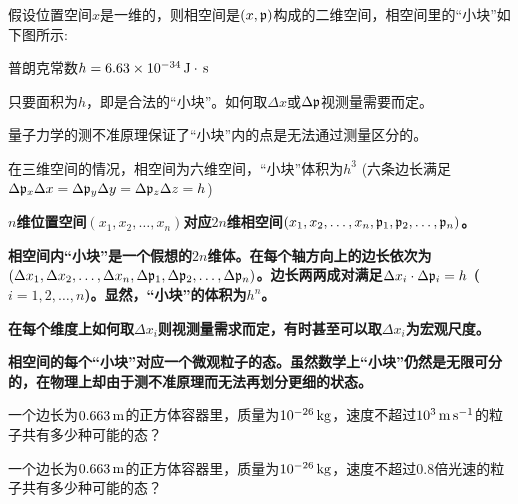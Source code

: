\documentclass[CJK]{beamer}
\begin{document}
\begin{frame}
\bch
假设位置空间$x$是一维的，则相空间是$(x, {\mathfrak{p}})$构成的二维空间，相空间里的“小块”如下图所示:
\emini
{}
\bitem
\item{普朗克常数$h=6.63\times 10^{-34}\,\mathrm{J}\cdot\,\mathrm{s}$}
\item{只要面积为$h$，即是合法的“小块”。如何取$\Delta x$或$\Delta {\mathfrak{p}}$视测量需要而定。}
\item{量子力学的测不准原理保证了“小块”内的点是无法通过测量区分的。}
\eitem
\emini

\skipline

在三维空间的情况，相空间为六维空间，“小块”体积为$h^3$ (六条边长满足$\Delta {\mathfrak{p}}_x\Delta x =\Delta {\mathfrak{p}}_y\Delta y =\Delta {\mathfrak{p}}_z\Delta z = h$)
\ech
\end{frame}


\begin{frame}
\bch
\bitem
\item{\bf $n$维位置空间$(x_1, x_2, \ldots, x_n)$对应$2n$维相空间$(x_1, x_2, \ldots, x_n, {\mathfrak{p}}_1, {\mathfrak{p}}_2, \ldots, {\mathfrak{p}}_n)$。}
\item{\bf 相空间内“小块”是一个假想的$2n$维体。在每个轴方向上的边长依次为$(\Delta x_1, \Delta x_2, \ldots, \Delta x_n, \Delta {\mathfrak{p}}_1, \Delta {\mathfrak{p}}_2, \ldots, \Delta {\mathfrak{p}}_n)$。边长两两成对满足$\Delta x_i \cdot \Delta {\mathfrak{p}}_i = h$ ($i=1, 2, \ldots, n$)。显然，“小块”的体积为$h^n$。}
\item{\bf 在每个维度上如何取$\Delta x_i$则视测量需求而定，有时甚至可以取$\Delta x_i$为宏观尺度。}
\item{\bf 相空间的每个“小块”对应一个微观粒子的态。虽然数学上“小块”仍然是无限可分的，在物理上却由于测不准原理而无法再划分更细的状态。}
\eitem
\ech
\end{frame}

\begin{frame}
\bch
一个边长为$0.663\,\mathrm{m}$的正方体容器里，质量为$10^{-26}\,\mathrm{kg}$，速度不超过$10^3\,\mathrm{m}\,\mathrm{s}^{-1}$的粒子共有多少种可能的态？
\ech
\end{frame}

\begin{frame}
\bch
一个边长为$0.663\,\mathrm{m}$的正方体容器里，质量为$10^{-26}\,\mathrm{kg}$，速度不超过$0.8$倍光速的粒子共有多少种可能的态？
\ech
\end{frame}
\end{document}
